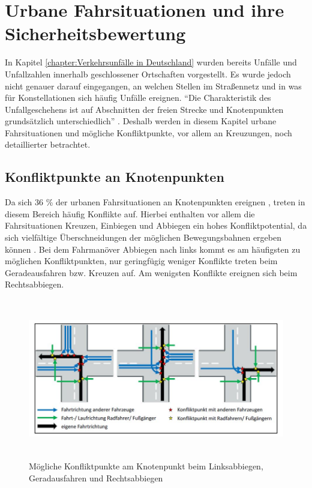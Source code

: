 \section{Urbane Fahrsituationen und ihre Sicherheitsbewertung}\label{section:urbane Fahrsituationen und ihre Sicherheitsbewertung}
In Kapitel \ref{chapter:Verkehrsunfälle in Deutschland} wurden bereits Unfälle und Unfallzahlen innerhalb geschlossener Ortschaften vorgestellt. Es wurde jedoch nicht genauer darauf eingegangen, an welchen Stellen im Straßennetz und in was für Konstellationen sich häufig Unfälle ereignen. \enquote{Die Charakteristik des Unfallgeschehens ist auf Abschnitten der freien Strecke und Knotenpunkten grundsätzlich unterschiedlich} \parencite[S. 83]{Aurich.2015}. Deshalb werden in diesem Kapitel urbane Fahrsituationen und mögliche Konfliktpunkte, vor allem an Kreuzungen, noch detaillierter betrachtet.

\subsection{Konfliktpunkte an Knotenpunkten}\label{subsection:Konfliktpunkte an Knotenpunkten}
Da sich 36 \% der urbanen Fahrsituationen an Knotenpunkten ereignen \parencite[S. 40]{Gerstenberger.17.02.2015}, treten in diesem Bereich häufig Konflikte auf. Hierbei enthalten vor allem die Fahrsituationen Kreuzen, Einbiegen und Abbiegen ein hohes Konfliktpotential, da sich vielfältige Überschneidungen der möglichen Bewegungsbahnen ergeben können \parencite[S. 83]{Reichart.2001}. Bei dem Fahrmanöver Abbiegen nach links kommt es am häufigsten zu möglichen Konfliktpunkten, nur geringfügig weniger Konflikte treten beim Geradeausfahren bzw. Kreuzen auf. Am wenigsten Konflikte ereignen sich beim Rechtsabbiegen.

\begin{savenotes}
	\begin{figure}[H]
		\centering
		\includegraphics[width=15cm,height=7cm]{figures/Konfliktpunkte}
		\caption[Mögliche Konfliktpunkte am Knotenpunkt beim Linksabbiegen, Geradausfahren und Rechtsabbiegen]{Mögliche Konfliktpunkte am Knotenpunkt beim Linksabbiegen, Geradausfahren und Rechtsabbiegen \parencite[S. 41]{Gerstenberger.17.02.2015}}\label{fig:Konfliktpunke am Knotenpunkt}
	\end{figure}
\end{savenotes}

